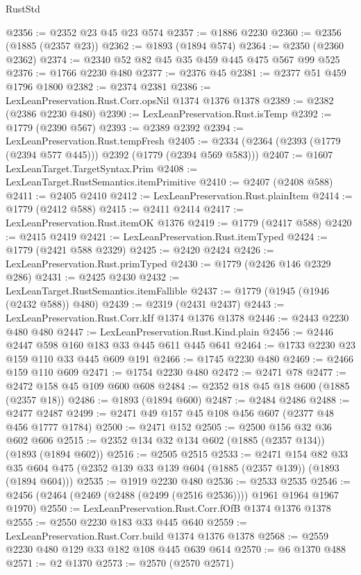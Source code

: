 \begin{lexlean}{RustStd}
\begin{coremodule}
@2356 := @2352 @23 @45 @23 @574
@2357 := @1886 @2230
@2360 := @2356 (@1885 (@2357 @23))
@2362 := @1893 (@1894 @574)
@2364 := @2350 (@2360 @2362)
@2374 := @2340 @52 @82 @45 @35 @459 @445 @475 @567 @99 @525
@2376 := @1766 @2230 @480
@2377 := @2376 @45
@2381 := @2377 @51 @459 @1796 @1800
@2382 := @2374 @2381
@2386 := LexLeanPreservation.Rust.Corr.opsNil @1374 @1376 @1378
@2389 := @2382 (@2386 @2230 @480)
@2390 := LexLeanPreservation.Rust.isTemp
@2392 := @1779 (@2390 @567)
@2393 := @2389 @2392
@2394 := LexLeanPreservation.Rust.tempFresh
@2405 := @2334 (@2364 (@2393 (@1779 (@2394 @577 @445))) @2392 (@1779 (@2394 @569 @583)))
@2407 := @1607 LexLeanTarget.TargetSyntax.Prim
@2408 := LexLeanTarget.RustSemantics.itemPrimitive
@2410 := @2407 (@2408 @588)
@2411 := @2405 @2410
@2412 := LexLeanPreservation.Rust.plainItem
@2414 := @1779 (@2412 @588)
@2415 := @2411 @2414
@2417 := LexLeanPreservation.Rust.itemOK @1376
@2419 := @1779 (@2417 @588)
@2420 := @2415 @2419
@2421 := LexLeanPreservation.Rust.itemTyped
@2424 := @1779 (@2421 @588 @2329)
@2425 := @2420 @2424
@2426 := LexLeanPreservation.Rust.primTyped
@2430 := @1779 (@2426 @146 @2329 @286)
@2431 := @2425 @2430
@2432 := LexLeanTarget.RustSemantics.itemFallible
@2437 := @1779 (@1945 (@1946 (@2432 @588)) @480)
@2439 := @2319 (@2431 @2437)
@2443 := LexLeanPreservation.Rust.Corr.kIf @1374 @1376 @1378
@2446 := @2443 @2230 @480 @480
@2447 := LexLeanPreservation.Rust.Kind.plain
@2456 := @2446 @2447 @598 @160 @183 @33 @445 @611 @445 @641
@2464 := @1733 @2230 @23 @159 @110 @33 @445 @609 @191
@2466 := @1745 @2230 @480
@2469 := @2466 @159 @110 @609
@2471 := @1754 @2230 @480
@2472 := @2471 @78
@2477 := @2472 @158 @45 @109 @600 @608
@2484 := @2352 @18 @45 @18 @600 (@1885 (@2357 @18))
@2486 := @1893 (@1894 @600)
@2487 := @2484 @2486
@2488 := @2477 @2487
@2499 := @2471 @49 @157 @45 @108 @456 @607 (@2377 @48 @456 @1777 @1784)
@2500 := @2471 @152
@2505 := @2500 @156 @32 @36 @602 @606
@2515 := @2352 @134 @32 @134 @602 (@1885 (@2357 @134)) (@1893 (@1894 @602))
@2516 := @2505 @2515
@2533 := @2471
    @154
    @82
    @33
    @35
    @604
    @475
    (@2352 @139 @33 @139 @604 (@1885 (@2357 @139)) (@1893 (@1894 @604)))
@2535 := @1919 @2230 @480
@2536 := @2533 @2535
@2546 := @2456 (@2464 (@2469 (@2488 (@2499 (@2516 @2536)))) @1961 @1964 @1967 @1970)
@2550 := LexLeanPreservation.Rust.Corr.fOfB @1374 @1376 @1378
@2555 := @2550 @2230 @183 @33 @445 @640
@2559 := LexLeanPreservation.Rust.Corr.build @1374 @1376 @1378
@2568 := @2559 @2230 @480 @129 @33 @182 @108 @445 @639 @614
@2570 := @6 @1370 @488
@2571 := @2 @1370
@2573 := @2570 (@2570 @2571)

\end{coremodule}
\end{lexlean}
